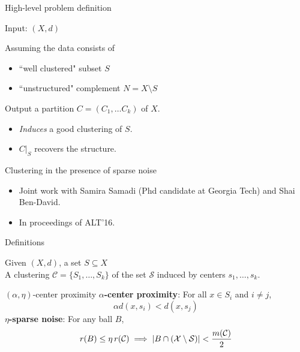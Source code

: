\documentclass{beamer}
\newcommand{\mc}{\mathcal}
\begin{document}
\begin{frame}{High-level problem definition}

	Input: $(X, d)$
	\vspace{20pt}

	Assuming the data consists of 
	\begin{itemize}
	\vspace{10pt}
	\item ``well clustered" subset $S$  
	\vspace{10pt}
	\item ``unstructured" complement $N= X \setminus S$
	\end{itemize}

	\vspace{30pt}
	{\color{blue} Output} a partition $C=(C_1, \ldots C_k)$ of $X$.
	\begin{itemize}
		\vspace{5pt}\item \emph{Induces} a good clustering of $S$. 
		\vspace{5pt}\item $C|_{S}$ recovers the structure.
	\end{itemize}

\end{frame}

\begin{frame}{Clustering in the presence of sparse noise}
	\begin{itemize}
		\item Joint work with Samira Samadi (Phd candidate at Georgia Tech) and Shai Ben-David.
		\vspace{20pt}\item In proceedings of \alert{ALT'16}. 
	\end{itemize}
\end{frame}

\begin{frame}{Definitions}

	Given $(X, d)$, a set $S \subseteq X$\\
	\vspace{0.5cm}A clustering $\mc C = \{S_1, \ldots, S_k\}$ of the set $\mc S$ induced by centers $s_1, \ldots, s_k$.

	\vspace{10pt}\begin{block}{$(\alpha, \eta)$-center proximity}
	\vspace{0.5cm} {\bf $\alpha$-center proximity}: For all $x \in S_i$ and $i\neq j$, $$\alpha d(x, s_i) < d(x, s_j)$$
	{\bf $\eta$-sparse noise}: For any ball $B$, 
	$$r(B)\leq \eta \thinspace r(\mc{C}) \implies |B\cap (\mc X\setminus \mc S)| < \frac{m(\mc C)}{2}$$
	\end{block}
\end{frame}
\end{document}
